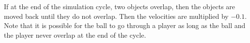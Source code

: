 If at the end of the simulation cycle, two objects overlap, 
then the objects are moved back until they do not overlap.
Then the velocities are multiplied by $-0.1$.
Note that it is possible for the ball to go through a player as long
as the ball and the player never overlap at the end of the cycle.

